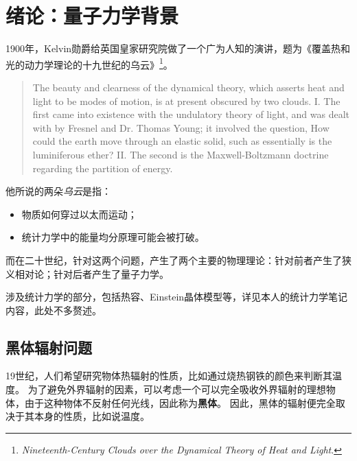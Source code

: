 \setcounter{chapter}{-1}
\chapter{绪论：量子力学背景}

1900年，Kelvin勋爵给英国皇家研究院做了一个广为人知的演讲，题为《覆盖热和光的动力学理论的十九世纪的乌云》\footnote{\textit{Nineteenth-Century Clouds over the Dynamical Theory of Heat and Light}. }。
\begin{quote}
	The beauty and clearness of the dynamical theory, which asserts heat and light to be modes of motion, is at present obscured by two clouds.
	I. The first came into existence with the undulatory theory of light, and was dealt with by Fresnel and Dr. Thomas Young; it involved the question, How could the earth move through an elastic solid, such as essentially is the luminiferous ether?
	II. The second is the Maxwell-Boltzmann doctrine regarding the partition of energy.
\end{quote}
他所说的两朵\textit{乌云}是指：
\begin{itemize}
    \item 物质如何穿过以太而运动；%
    \item 统计力学中的能量均分原理可能会被打破。
\end{itemize}
而在二十世纪，针对这两个问题，产生了两个主要的物理理论：针对前者产生了狭义相对论；针对后者产生了量子力学。%

涉及统计力学的部分，包括热容、Einstein晶体模型等，详见本人的统计力学笔记内容，此处不多赘述。

\section{黑体辐射问题}

19世纪，人们希望研究物体热辐射的性质，比如通过烧热钢铁的颜色来判断其温度。
为了避免外界辐射的因素，可以考虑一个可以完全吸收外界辐射的理想物体，由于这种物体不反射任何光线，因此称为\textbf{黑体}。
因此，黑体的辐射便完全取决于其本身的性质，比如说温度。

